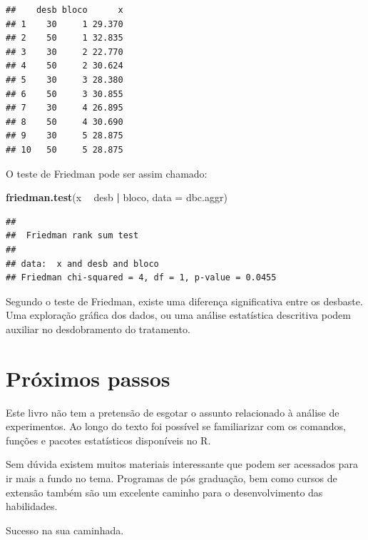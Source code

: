 \documentclass[
]{article}
\newenvironment{Shaded}{\begin{snugshade}}{\end{snugshade}}
\newcommand{\DataTypeTok}[1]{\textcolor[rgb]{0.13,0.29,0.53}{#1}}
\newcommand{\KeywordTok}[1]{\textcolor[rgb]{0.13,0.29,0.53}{\textbf{#1}}}
\newcommand{\NormalTok}[1]{#1}
\newcommand{\OperatorTok}[1]{\textcolor[rgb]{0.81,0.36,0.00}{\textbf{#1}}}
\newcommand{\StringTok}[1]{\textcolor[rgb]{0.31,0.60,0.02}{#1}}
\begin{document}
\begin{verbatim}
##    desb bloco      x
## 1    30     1 29.370
## 2    50     1 32.835
## 3    30     2 22.770
## 4    50     2 30.624
## 5    30     3 28.380
## 6    50     3 30.855
## 7    30     4 26.895
## 8    50     4 30.690
## 9    30     5 28.875
## 10   50     5 28.875
\end{verbatim}

O teste de Friedman pode ser assim chamado:

\begin{Shaded}
\begin{Highlighting}[]
\KeywordTok{friedman.test}\NormalTok{(x }\OperatorTok{~}\StringTok{ }\NormalTok{desb }\OperatorTok{|}\StringTok{ }\NormalTok{bloco, }\DataTypeTok{data =}\NormalTok{ dbc.aggr)}
\end{Highlighting}
\end{Shaded}

\begin{verbatim}
## 
##  Friedman rank sum test
## 
## data:  x and desb and bloco
## Friedman chi-squared = 4, df = 1, p-value = 0.0455
\end{verbatim}

Segundo o teste de Friedman, existe uma diferença significativa entre os desbaste. Uma exploração gráfica dos dados, ou uma análise estatística descritiva podem auxiliar no desdobramento do tratamento.

\hypertarget{pruxf3ximos-passos}{%
\section{Próximos passos}\label{pruxf3ximos-passos}}

Este livro não tem a pretensão de esgotar o assunto relacionado à análise de experimentos. Ao longo do texto foi possível se familiarizar com os comandos, funções e pacotes estatísticos disponíveis no R.

Sem dúvida existem muitos materiais interessante que podem ser acessados para ir mais a fundo no tema. Programas de pós graduação, bem como cursos de extensão também são um excelente caminho para o desenvolvimento das habilidades.

Sucesso na sua caminhada.
\end{document}
